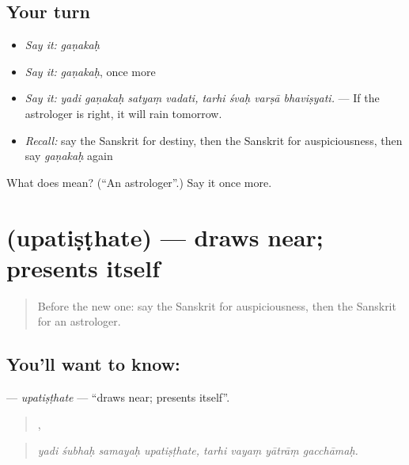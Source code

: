\subsection*{Your turn}
\begin{itemize}
\raggedright
  \item \emph{Say it:} \emph{gaṇakaḥ}
  \item \emph{Say it:} \emph{gaṇakaḥ}, once more
  \item \emph{Say it:} \emph{yadi gaṇakaḥ satyaṃ vadati, tarhi śvaḥ varṣā bhaviṣyati.} — If the astrologer is right, it will rain tomorrow.
  \item \emph{Recall:} say the Sanskrit for destiny, then the Sanskrit for auspiciousness, then say \emph{gaṇakaḥ} again
\end{itemize}

\begin{tcolorbox}[breakable,colback=teal!4,colframe=teal!35!black,title={Before you move on}]
What does  mean? (\textquotedblleft{}An astrologer\textquotedblright{}.) Say it once more.
\end{tcolorbox}
\section[\texorpdfstring{\sk{उपतिष्ठते} (upatiṣṭhate)}{उपतिष्ठते (upatiṣṭhate)}]{ (upatiṣṭhate) — draws near; presents itself}

\label{lesson:SA-C538-upatisthate}



\begin{quote}
Before the new one: say the Sanskrit for auspiciousness, then the Sanskrit for an astrologer.
\end{quote}

\subsection*{You'll want to know: }
\textbf{} — \emph{upatiṣṭhate} — \textquotedblleft{}draws near; presents itself\textquotedblright{}.

\begin{quote}
   ,    
\end{quote}

\begin{quote}
\emph{yadi śubhaḥ samayaḥ upatiṣṭhate, tarhi vayaṃ yātrāṃ gacchāmaḥ.}
\end{quote}

